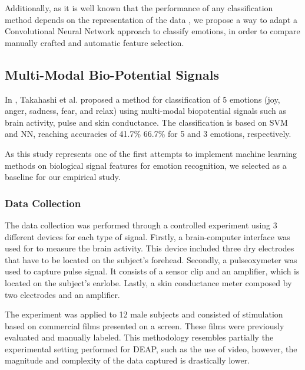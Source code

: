 \documentclass{sig-alternate}
\begin{document}
Additionally, as it is well known that the performance of any 
classification method depends on the representation of the data 
\cite{bengio2013representation}, 
we propose a way to adapt a Convolutional Neural 
Network approach to classify emotions, in order to compare  
manually crafted and automatic feature selection. 

\subsection{ Multi-Modal Bio-Potential Signals}	

In \cite{takahashi2004}, Takahashi et al. proposed a  method for 
 classification of 5 emotions (joy, anger, sadness, fear, and relax)
using multi-modal biopotential signals such as brain activity, pulse and
 skin conductance. The classification is based on SVM and NN, reaching 
 accuracies of  41.7\%  66.7\% for 5 and 3 emotions, respectively. 
 
As this  study represents one of the first attempts to implement 
machine learning methods on biological signal features for emotion
 recognition, we selected as a baseline for our empirical study. 
 
\subsubsection{Data Collection}

The data collection was performed through a controlled 
experiment using 3 different devices for each type of signal. 
Firstly,  a  brain-computer interface was used for to measure 
the brain activity. This device included 
three dry electrodes that have to be located on the subject's 
forehead. Secondly, a pulseoxymeter was used to capture 
pulse signal. It consists of a sensor clip and an amplifier, which 
is located  on the  subject's earlobe. Lastly, a skin 
conductance meter composed by two electrodes and an amplifier. 

The experiment  was applied to 12  male subjects and  
consisted of stimulation based  on commercial 
films presented on a screen. These films were previously 
evaluated and manually labeled. This methodology resembles
partially the experimental setting performed for DEAP, such
as the use of video, however, the magnitude and complexity of
the data captured is drastically lower.
\end{document}
